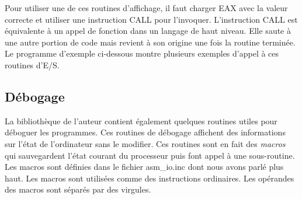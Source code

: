 Pour utiliser une de ces routines d'affichage, il faut charger EAX avec la valeur correcte
et utiliser une instruction {\code CALL} pour l'invoquer. L'instruction {\code CALL} est
équivalente à un appel de fonction dans un langage de haut niveau. Elle saute à une
autre portion de code mais revient à son origine une fois la routine terminée. Le programme
d'exemple ci-dessous montre plusieurs exemples d'appel à ces routines d'E/S.

\subsection{Débogage}

La bibliothèque de l'auteur contient également quelques routines utiles pour
déboguer les programmes. Ces routines de débogage affichent des informations sur
l'état de l'ordinateur sans le modifier. Ces routines sont en fait des
\emph{macros} qui sauvegardent l'état courant du processeur puis font appel à une
sous-routine. Les macros sont définies dans le fichier {\code asm\_io.inc} dont
nous avons parlé plus haut. Les macros sont utilisées comme des instructions ordinaires.
Les opérandes des macros sont séparés par des virgules.

